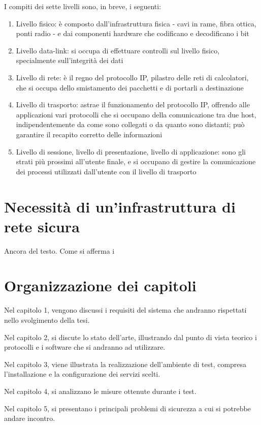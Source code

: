 I compiti dei sette livelli sono, in breve, i seguenti:
\begin{enumerate}
    \item Livello fisico: è composto dall'infrastruttura fisica - cavi in rame, fibra ottica, ponti radio - e dai componenti hardware che codificano e decodificano i bit
    \item Livello data-link: si occupa di effettuare controlli sul livello fisico, specialmente sull'integrità dei dati
    \item Livello di rete: è il regno del protocollo IP, pilastro delle reti di calcolatori, che si occupa dello smistamento dei pacchetti e di portarli a destinazione
    \item Livello di trasporto: astrae il funzionamento del protocollo IP, offrendo alle applicazioni vari protocolli che si occupano della comunicazione tra due host, indipendentemente da come sono collegati o da quanto sono distanti; può garantire il recapito corretto delle informazioni
    \item Livello di sessione, livello di presentazione, livello di applicazione: sono gli strati più prossimi all'utente finale, e si occupano di gestire la comunicazione dei processi utilizzati dall'utente con il livello di trasporto
\end{enumerate}


\section{Necessità di un'infrastruttura di rete sicura}

Ancora del testo. Come si afferma i
\section{Organizzazione dei capitoli}

Nel capitolo 1, vengono discussi i requisiti del sistema che andranno rispettati nello svolgimento della tesi.

Nel capitolo 2, si discute lo stato dell'arte, illustrando dal punto di vista teorico i protocolli e i software che si andranno ad utilizzare.

Nel capitolo 3, viene illustrata la realizzazione dell'ambiente di test, compresa l'installazione e la configurazione dei servizi scelti.

Nel capitolo 4, si analizzano le misure ottenute durante i test.

Nel capitolo 5, si presentano i principali problemi di sicurezza a cui si potrebbe andare incontro.

